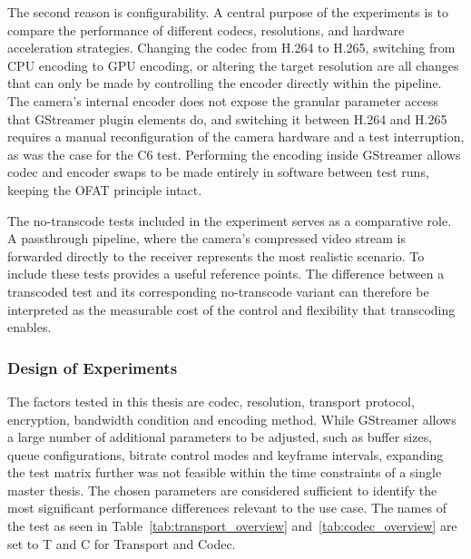 The second reason is configurability. A central purpose of the experiments is to compare the performance of different codecs, resolutions, and hardware acceleration strategies. Changing the codec from H.264 to H.265, switching from CPU encoding to GPU encoding, or altering the target resolution are all changes that can only be made by controlling the encoder directly within the pipeline. The camera's internal encoder does not expose the granular parameter access that GStreamer plugin elements do, and switching it between H.264 and H.265 requires a manual reconfiguration of the camera hardware and a test interruption, as was the case for the C6 test. Performing the encoding inside GStreamer allows codec and encoder swaps to be made entirely in software between test runs, keeping the OFAT principle intact.

The no-transcode tests included in the experiment serves as a comparative role. A passthrough pipeline, where the camera's compressed video stream is forwarded directly to the receiver represents the most realistic scenario. To include these tests provides a useful reference points. The difference between a transcoded test and its corresponding no-transcode variant can therefore be interpreted as the measurable cost of the control and flexibility that transcoding enables.

\subsubsection{Design of Experiments}

The factors tested in this thesis are codec, resolution, transport protocol, encryption, bandwidth condition and encoding method. While GStreamer allows a large number of additional parameters to be adjusted, such as buffer sizes, queue configurations, bitrate control modes and keyframe intervals, expanding the test matrix further was not feasible within the time constraints of a single master thesis. The chosen parameters are considered sufficient to identify the most significant performance differences relevant to the use case. The names of the test as seen in Table~\ref{tab:transport_overview} and~\ref{tab:codec_overview} are set to T and C for Transport and Codec.



